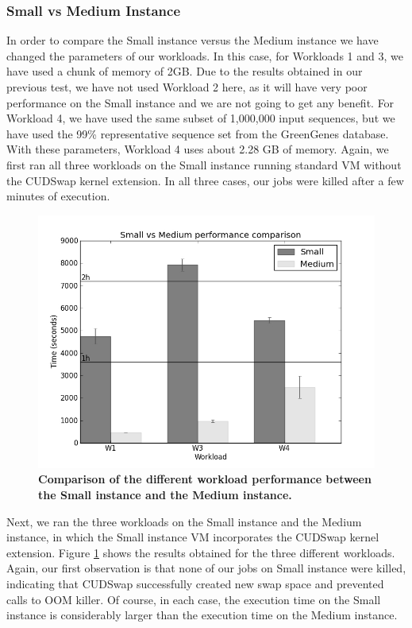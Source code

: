 \subsubsection{Small vs Medium Instance}

In order to compare the Small instance versus the Medium instance we have
changed the parameters of our workloads. In this case, for Workloads 1
and 3, we have used a chunk of memory of 2GB. Due to the results obtained
in our previous test, we have not used Workload 2 here, as it will have
very poor performance on the Small instance and we are not going to get
any benefit. For Workload 4, we have used the same subset of 1,000,000
input sequences, but we have used the 99\% representative sequence set
from the GreenGenes database. With these parameters, Workload 4 uses about
2.28 GB of memory. Again, we first ran all three workloads on the Small
instance running standard VM without the CUDSwap kernel extension. In all
three cases, our jobs were killed after a few minutes of execution.

\begin{figure}[htbp]
\includegraphics[width=\columnwidth]{chapter_cudswap_figures/small_vs_medium.jpg}
\caption[Comparison of the different workload performance between the Small instance and the Medium instance]{\textbf{Comparison of the different workload performance between the Small instance and the Medium instance.}}
\label{cudswapfigure3}
\end{figure}

Next, we ran the three workloads on the Small instance and the Medium instance,
in which the Small instance VM incorporates the CUDSwap kernel extension.
Figure \ref{cudswapfigure3} shows the results obtained for the
three different workloads. Again, our first observation is that none of
our jobs on Small instance were killed, indicating that CUDSwap successfully
created new swap space and prevented calls to OOM killer. Of course, in each
case, the execution time on the Small instance is considerably larger than
the execution time on the Medium instance.

